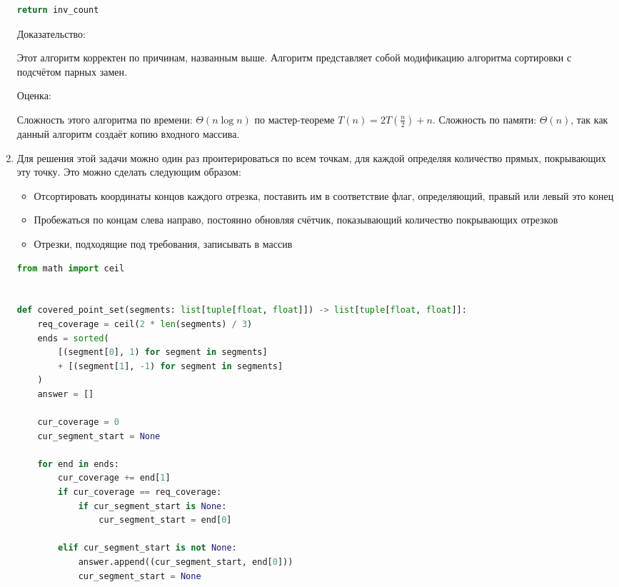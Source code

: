 \documentclass{article}
\begin{document}
\begin{enumerate}
\begin{lstlisting}[language=Python]
    return inv_count
        \end{lstlisting}
          Доказательство:

          Этот алгоритм корректен по причинам, названным выше.
          Алгоритм представляет собой модификацию алгоритма сортировки
          с подсчётом парных замен.

          Оценка:

          Сложность этого алгоритма по времени:
          $\Theta(n \log n)$
          по мастер-теореме $T(n) = 2T(\frac{n}{2}) + n$.
          Сложность по памяти: $\Theta(n)$, так как данный алгоритм
          создаёт копию входного массива.

    \item
          Для решения этой задачи можно один раз проитерироваться
          по всем точкам, для каждой определяя количество прямых,
          покрывающих эту точку. Это можно сделать следующим образом:
          \begin{itemize}
              \item Отсортировать координаты концов каждого отрезка,
                    поставить им в соответствие флаг,
                    определяющий, правый или левый это конец
              \item Пробежаться по концам слева направо,
                    постоянно обновляя счётчик, показывающий
                    количество покрывающих отрезков
              \item Отрезки, подходящие под требования, записывать
                    в массив
          \end{itemize}

          \begin{lstlisting}[language=Python]
from math import ceil


def covered_point_set(segments: list[tuple[float, float]]) -> list[tuple[float, float]]:
    req_coverage = ceil(2 * len(segments) / 3)
    ends = sorted(
        [(segment[0], 1) for segment in segments]
        + [(segment[1], -1) for segment in segments]
    )
    answer = []

    cur_coverage = 0
    cur_segment_start = None

    for end in ends:
        cur_coverage += end[1]
        if cur_coverage == req_coverage:
            if cur_segment_start is None:
                cur_segment_start = end[0]

        elif cur_segment_start is not None:
            answer.append((cur_segment_start, end[0]))
            cur_segment_start = None


\end{lstlisting}
\end{enumerate}
\end{document}
